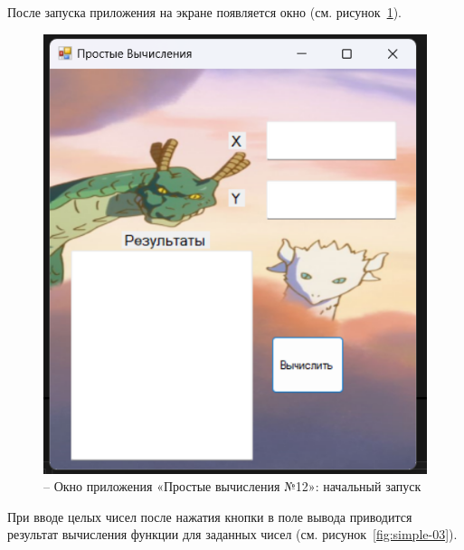 \documentclass[bachelor, och, pract, times]{SCWorks}
\begin{document}
После запуска приложения на экране появляется окно (см. рисунок~\ref{fig:simple-02}).
\begin{figure}[H]
    \centering
    \includegraphics[scale=0.7]{Скрины/Снимок экрана 2025-01-03 212123.png}
    \caption{– Окно приложения «Простые вычисления №12»: начальный запуск}\label{fig:simple-02}
\end{figure}

При вводе целых чисел после нажатия кнопки в поле вывода приводится
результат вычисления функции для заданных чисел (см. рисунок~\ref{fig:simple-03}).
\end{document}
